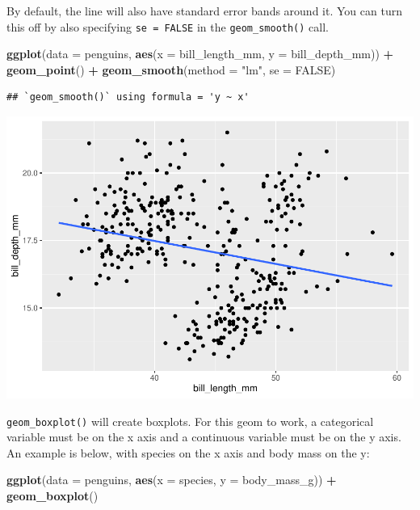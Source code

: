 \documentclass[
]{book}
\newenvironment{Shaded}{\begin{snugshade}}{\end{snugshade}}
\newcommand{\AttributeTok}[1]{\textcolor[rgb]{0.13,0.29,0.53}{#1}}
\newcommand{\ConstantTok}[1]{\textcolor[rgb]{0.56,0.35,0.01}{#1}}
\newcommand{\FunctionTok}[1]{\textcolor[rgb]{0.13,0.29,0.53}{\textbf{#1}}}
\newcommand{\NormalTok}[1]{#1}
\newcommand{\SpecialCharTok}[1]{\textcolor[rgb]{0.81,0.36,0.00}{\textbf{#1}}}
\newcommand{\StringTok}[1]{\textcolor[rgb]{0.31,0.60,0.02}{#1}}
\begin{document}
By default, the line will also have standard error bands around it. You can turn this off by also specifying \texttt{se\ =\ FALSE} in the \texttt{geom\_smooth()} call.

\begin{Shaded}
\begin{Highlighting}[]
\FunctionTok{ggplot}\NormalTok{(}\AttributeTok{data =}\NormalTok{ penguins, }\FunctionTok{aes}\NormalTok{(}\AttributeTok{x =}\NormalTok{ bill\_length\_mm, }\AttributeTok{y =}\NormalTok{ bill\_depth\_mm)) }\SpecialCharTok{+} 
  \FunctionTok{geom\_point}\NormalTok{() }\SpecialCharTok{+}
  \FunctionTok{geom\_smooth}\NormalTok{(}\AttributeTok{method =} \StringTok{"lm"}\NormalTok{, }\AttributeTok{se =} \ConstantTok{FALSE}\NormalTok{)}
\end{Highlighting}
\end{Shaded}

\begin{verbatim}
## `geom_smooth()` using formula = 'y ~ x'
\end{verbatim}

\includegraphics{_main_files/figure-latex/unnamed-chunk-53-1.pdf}

\texttt{geom\_boxplot()} will create boxplots. For this geom to work, a categorical variable must be on the x axis and a continuous variable must be on the y axis. An example is below, with species on the x axis and body mass on the y:

\begin{Shaded}
\begin{Highlighting}[]
\FunctionTok{ggplot}\NormalTok{(}\AttributeTok{data =}\NormalTok{ penguins, }\FunctionTok{aes}\NormalTok{(}\AttributeTok{x =}\NormalTok{ species, }\AttributeTok{y =}\NormalTok{ body\_mass\_g)) }\SpecialCharTok{+} 
  \FunctionTok{geom\_boxplot}\NormalTok{()}
\end{Highlighting}
\end{Shaded}
\end{document}
